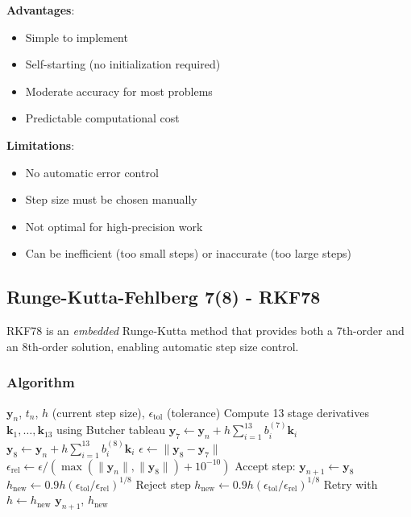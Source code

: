 \textbf{Advantages}:
\begin{itemize}
    \item Simple to implement
    \item Self-starting (no initialization required)
    \item Moderate accuracy for most problems
    \item Predictable computational cost
\end{itemize}

\textbf{Limitations}:
\begin{itemize}
    \item No automatic error control
    \item Step size must be chosen manually
    \item Not optimal for high-precision work
    \item Can be inefficient (too small steps) or inaccurate (too large steps)
\end{itemize}

\subsection{Runge-Kutta-Fehlberg 7(8) - RKF78}

RKF78 is an \textit{embedded} Runge-Kutta method that provides both a 7th-order and an 8th-order solution, enabling automatic step size control.

\subsubsection{Algorithm}

\begin{algorithm}[H]
\caption{RKF78 Adaptive Step}
\begin{algorithmic}[1]
\REQUIRE $\mathbf{y}_n$, $t_n$, $h$ (current step size), $\epsilon_{\text{tol}}$ (tolerance)
\STATE Compute 13 stage derivatives $\mathbf{k}_1, \ldots, \mathbf{k}_{13}$ using Butcher tableau
\STATE $\mathbf{y}_7 \gets \mathbf{y}_n + h\sum_{i=1}^{13} b_i^{(7)} \mathbf{k}_i$ 
\STATE $\mathbf{y}_8 \gets \mathbf{y}_n + h\sum_{i=1}^{13} b_i^{(8)} \mathbf{k}_i$ 
\STATE $\epsilon \gets \|\mathbf{y}_8 - \mathbf{y}_7\|$ 
\STATE $\epsilon_{\text{rel}} \gets \epsilon / (\max(\|\mathbf{y}_n\|, \|\mathbf{y}_8\|) + 10^{-10})$
    \STATE Accept step: $\mathbf{y}_{n+1} \gets \mathbf{y}_8$
    \STATE $h_{\text{new}} \gets 0.9 h (\epsilon_{\text{tol}}/\epsilon_{\text{rel}})^{1/8}$
\ELSE
    \STATE Reject step
    \STATE $h_{\text{new}} \gets 0.9 h (\epsilon_{\text{tol}}/\epsilon_{\text{rel}})^{1/8}$
    \STATE Retry with $h \gets h_{\text{new}}$
\ENDIF
\RETURN $\mathbf{y}_{n+1}$, $h_{\text{new}}$
\end{algorithmic}
\end{algorithm}

